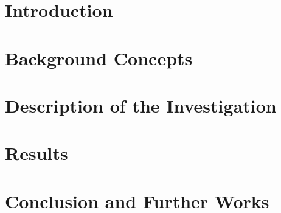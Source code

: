\documentclass[a4paper,11pt,oneside]{article}
\begin{document}
  
  
  
  

  

  \newpage
  \tableofcontents

  \clearpage
  
    \section{Introduction}
  
  
\section{Background Concepts}
 
  

  \section{Description of the Investigation}
  
  



  \section{Results}
  

  \section{Conclusion and Further Works}
 



  \newpage
%   
%   
  \printbibliography
\end{document}
